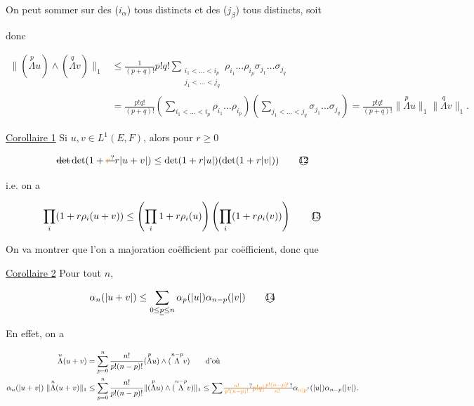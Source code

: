 On peut sommer sur des ($i_\alpha$) tous distincts et des ($j_\beta$) tous distincts, soit

donc

\[
\begin{aligned}
\lVert(\overset{p}{\Lambda}u)\wedge(\overset{q}{\Lambda}v)\rVert_1
&\leq\frac{1}{(p+q)!}p!q!\sum_{\substack{i_1<\ldots<i_p\\j_1<\ldots<j_q}}\rho_{i_1}\ldots\rho_{i_p}\sigma_{j_1}\ldots\sigma_{j_q}\\
&=\frac{p!q!}{(p+q)!}\left(\sum_{i_1<\ldots<i_p}\rho_{i_1}\ldots\rho_{i_p}\right)
\left(\sum_{j_1<\ldots<j_q}\sigma_{j_1}\ldots\sigma_{j_q}\right)
=\frac{p!q!}{(p+q)!}\lVert\overset{p}{\Lambda}u\rVert_1\lVert\overset{q}{\Lambda}v\rVert_1 .
\end{aligned}
\]

\uline{Corollaire 1} Si $u,v\in L^1(E,F)$, alors  pour $r\geq0$

\[
\deleted{\det}\det(1+\deleted{\unsure{r}}r|u+v|)\leq\det(1+r|u|)(\det(1+r|v|))\tag*{\textcircled{12}}
\]

i.e. on a

\[
\prod_i(1+r\rho_i(u+v))\leq\left(\prod_i1+r\rho_i(u)\right)\left(\prod_i(1+r\rho_i(v))\right)\tag*{\textcircled{13}}
\]

On va  montrer que l'on a majoration coëfficient par coëfficient, donc que

\uline{Corollaire 2} Pour tout $n$,

\[
\alpha_n(|u+v|)\leq\sum_{0\leq\underline{p}\leq n}\alpha_p(|u|)\alpha_{n-p}(|v|)\tag*{\textcircled{14}}
\]

En effet, on a  

\[
\begin{aligned}
\overset{n}{\Lambda}(u+v)&=\sum_{p=0}^n\frac{n!}{p!(n-p)!}(\overset{p}{\Lambda}u)\wedge(\overset{n-p}{\Lambda}v)\qquad\text{d'où}\\
\alpha_n(|u+v|)\ \lVert\overset{n}{\Lambda}(u+v)\rVert_1
&\leq\sum_{p=0}^n\frac{n!}{p!(n-p)!}\lVert(\overset{p}{\Lambda}u)\wedge(\overset{n-p}{\Lambda}v)\rVert_1\leq\sum\deleted{\unsure{\frac{n!}{p!(n-p)!}}}\deleted{\unsure{p!q|\frac{p!(n-p)!}{n!}}}\alpha_{\unsure{n|p}}(|u|)\alpha_{n-p}(|v|).
\end{aligned}
\]

